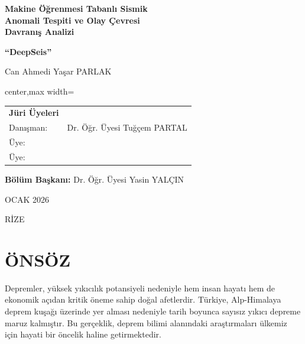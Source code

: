 \documentclass[12pt,a4paper,oneside]{book}
\begin{document}
\newpage
\thispagestyle{empty}
\begin{center}
    \vspace*{1cm}
    
    {\Large\bfseries Makine Öğrenmesi Tabanlı Sismik\\
    Anomali Tespiti ve Olay Çevresi\\
    Davranış Analizi\par}
    
    \vspace{0.5cm}
    {\Large\bfseries ``DeepSeis''\par}
    
    \vspace{2cm}
    {\Large Can Ahmedi Yaşar PARLAK\par}
    
    \vspace{3cm}
    
    \begin{adjustbox}{center,max width=\textwidth}
    \begin{tabular}{ll}
        \textbf{Jüri Üyeleri} & \\
        Danışman: & Dr. Öğr. Üyesi Tuğçem PARTAL \\
        Üye: & \\
        Üye: & \\
    \end{tabular}
    \end{adjustbox}
    
    \vspace{2cm}
    
    \textbf{Bölüm Başkanı:} Dr. Öğr. Üyesi Yasin YALÇIN
    
    \vfill
    
    {\large OCAK 2026\par}
    {\large RİZE\par}
\end{center}

\newpage
{}
\setcounter{page}{3}
\chapter*{ÖNSÖZ}

Depremler, yüksek yıkıcılık potansiyeli nedeniyle hem insan hayatı hem de ekonomik açıdan kritik öneme sahip doğal afetlerdir. Türkiye, Alp-Himalaya deprem kuşağı üzerinde yer alması nedeniyle tarih boyunca sayısız yıkıcı depreme maruz kalmıştır. Bu gerçeklik, deprem bilimi alanındaki araştırmaları ülkemiz için hayati bir öncelik haline getirmektedir.
\end{document}
